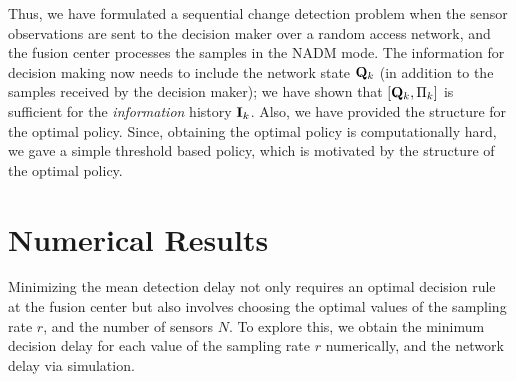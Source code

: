 \documentclass[acmtosn]{acmtrans2m}
\begin{document}
Thus, we have formulated a sequential change detection problem when the sensor 
observations are sent to the decision maker over a random access network, and 
the fusion center processes the samples in the {\sf NADM} mode. The information 
for decision making now needs to include the network state ${\bf Q}_k$ (in 
addition to the samples received by the decision maker); we have shown that 
$[{\bf Q}_k,\Pi_k]$ is sufficient for the {\em information} history ${\bf I}_k$. 
Also, we have provided the structure for the optimal policy. Since, obtaining 
the optimal policy is computationally hard, we gave a simple threshold based 
policy, which is motivated by the structure of the optimal policy. 



\section{Numerical Results}
\label{sec:optimal_parameters}
Minimizing the mean detection delay not only requires an optimal decision rule 
at the fusion center but also involves choosing the optimal values of the 
sampling rate $r$, and the number of sensors $N$. To explore this, we obtain the 
minimum decision delay for each value of the sampling rate $r$ numerically, and 
the network delay via simulation.
\end{document}
